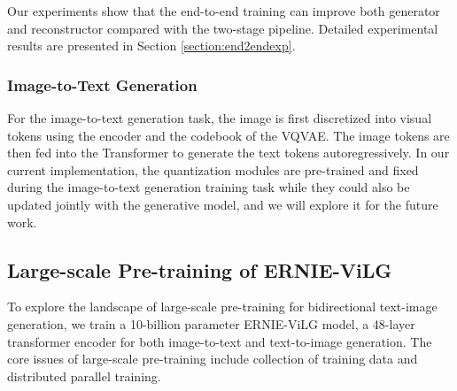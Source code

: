 \documentclass{article}
\begin{document}
Our experiments show that the end-to-end training can improve both generator and reconstructor compared with the two-stage pipeline. Detailed experimental results are presented in Section \ref{section:end2endexp}.

\subsubsection{Image-to-Text Generation}
For the image-to-text generation task, the image is first discretized into visual tokens using the encoder and the codebook of the VQVAE. The image tokens are then fed into the Transformer to generate the text tokens autoregressively. In our current implementation, the quantization modules are pre-trained and fixed during the image-to-text generation training task while they could also be updated jointly with the generative model, and we will explore it for the future work. 


\subsection{Large-scale Pre-training of ERNIE-ViLG}
To explore the landscape of large-scale pre-training for bidirectional text-image generation, we train a 10-billion parameter ERNIE-ViLG model, a 48-layer transformer encoder for both image-to-text and text-to-image generation. The core issues of large-scale pre-training include collection of training data and distributed parallel training.
\end{document}

